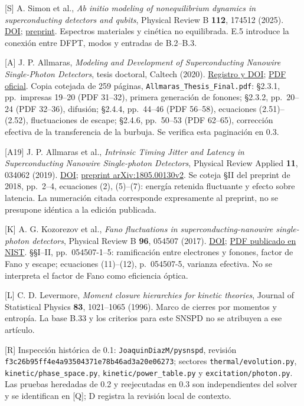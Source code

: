 \documentclass[
  spanish,
  10pt,
  a4paper,
]{article}
\newcounter{none} %
\begin{document}
{[}S{]} A. Simon et al., \emph{Ab initio modeling of nonequilibrium
dynamics in superconducting detectors and qubits}, Physical Review B
\textbf{112}, 174512 (2025).
\href{https://doi.org/10.1103/3m2k-mzr6}{DOI};
\href{https://arxiv.org/abs/2501.13791}{preprint}. Espectros materiales
y cinética no equilibrada. E.5 introduce la conexión entre DFPT, modos y
entradas de B.2--B.3.

{[}A{]} J. P. Allmaras, \emph{Modeling and Development of
Superconducting Nanowire Single-Photon Detectors}, tesis doctoral,
Caltech (2020). \href{https://thesis.caltech.edu/13748/}{Registro y
DOI};
\href{https://thesis.caltech.edu/13748/08/Allmaras_Thesis_Final.pdf}{PDF
oficial}. Copia cotejada de 259 páginas,
\nolinkurl{Allmaras_Thesis_Final.pdf}: §2.3.1, pp.~impresas 19--20 (PDF
31--32), primera generación de fonones; §2.3.2, pp.~20--24 (PDF 32--36),
difusión; §2.4.4, pp.~44--46 (PDF 56--58), ecuaciones (2.51)--(2.52),
fluctuaciones de escape; §2.4.6, pp.~50--53 (PDF 62--65), corrección
efectiva de la transferencia de la burbuja. Se verifica esta paginación
en 0.3.

{[}A19{]} J. P. Allmaras et al., \emph{Intrinsic Timing Jitter and
Latency in Superconducting Nanowire Single-photon Detectors}, Physical
Review Applied \textbf{11}, 034062 (2019).
\href{https://doi.org/10.1103/PhysRevApplied.11.034062}{DOI};
\href{https://arxiv.org/pdf/1805.00130v2}{preprint arXiv:1805.00130v2}.
Se coteja §II del preprint de 2018, pp.~2--4, ecuaciones (2), (5)--(7):
energía retenida fluctuante y efecto sobre latencia. La numeración
citada corresponde expresamente al preprint, no se presupone idéntica a
la edición publicada.

{[}K{]} A. G. Kozorezov et al., \emph{Fano fluctuations in
superconducting-nanowire single-photon detectors}, Physical Review B
\textbf{96}, 054507 (2017).
\href{https://doi.org/10.1103/PhysRevB.96.054507}{DOI};
\href{https://tsapps.nist.gov/publication/get_pdf.cfm?pub_id=920691}{PDF
publicado en NIST}. §§I--II, pp.~054507-1--5: ramificación entre
electrones y fonones, factor de Fano y escape; ecuaciones (11)--(12),
p.~054507-5, varianza efectiva. No se interpreta el factor de Fano como
eficiencia óptica.

{[}L{]} C. D. Levermore, \emph{Moment closure hierarchies for kinetic
theories}, Journal of Statistical Physics \textbf{83}, 1021--1065
(1996). Marco de cierres por momentos y entropía. La base B.33 y los
criterios para este SNSPD no se atribuyen a ese artículo.

{[}R{]} Inspección histórica de 0.1: \nolinkurl{JoaquinDiazM/pysnspd},
revisión \nolinkurl{f3c26b95ff4e4a93504371e78b46ad3a20e06273}; sectores
\nolinkurl{thermal/evolution.py}, \nolinkurl{kinetic/phase_space.py},
\nolinkurl{kinetic/power_table.py} y \nolinkurl{excitation/photon.py}. Las
pruebas heredadas de 0.2 y reejecutadas en 0.3 son independientes del
solver y se identifican en {[}Q{]}; D registra la revisión local de
contexto.
\end{document}
